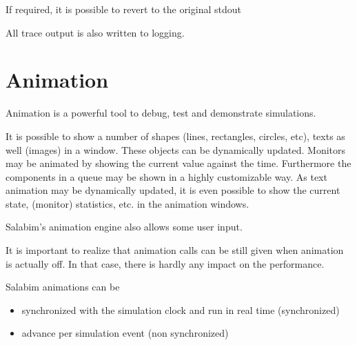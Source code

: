\documentclass[letterpaper,10pt,english]{sphinxmanual}
\begin{document}
\begin{sphinxVerbatim}[commandchars=\\\{\}]
  
   
\end{sphinxVerbatim}

If required, it is possible to revert to the original stdout

\begin{sphinxVerbatim}[commandchars=\\\{\}]
  
\end{sphinxVerbatim}

All trace output is also written to logging.


\chapter{Animation}
\label{\detokenize{Animation:animation}}\label{\detokenize{Animation::doc}}
Animation is a powerful tool to debug, test and demonstrate simulations.

It is possible to show a number of shapes (lines, rectangles, circles, etc), texts as well (images) in a window. These objects can be dynamically updated.
Monitors may be animated by showing the current value against the time.
Furthermore the components in a queue may be shown in a highly customizable way.
As text animation may be dynamically updated, it is even possible to show the current state, (monitor) statistics, etc. in the animation windows.

Salabim’s animation engine also allows some user input.

It is important to realize that animation calls can be still given when animation is actually off. In that case, there is hardly any impact on the performance.

Salabim animations can be
\begin{itemize}
\item {} 
synchronized with the simulation clock and run in real time (synchronized)

\item {} 
advance per simulation event (non synchronized)

\end{itemize}
\end{document}
